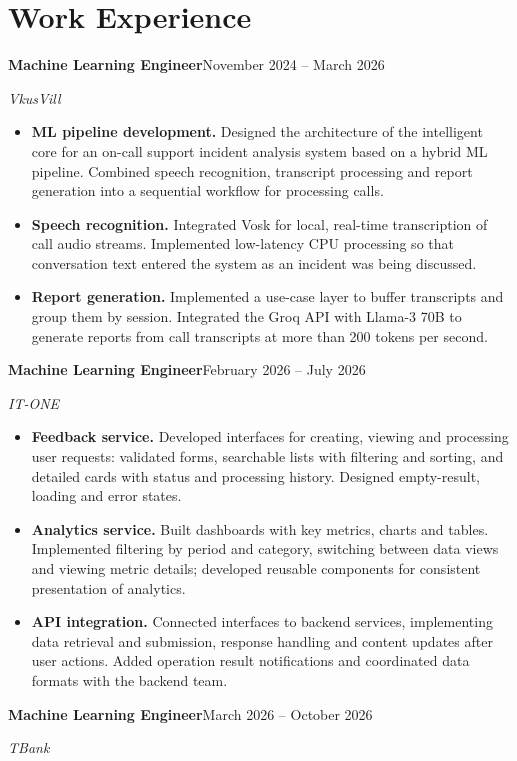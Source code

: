\documentclass[a4paper,11pt]{article}
\newcommand{\entry}[3]{\textbf{#1}\hfill #3\par\textit{#2}\par}
\begin{document}
\section*{Work Experience}
\entry{Machine Learning Engineer}{VkusVill}{November 2024 -- March 2026}
\begin{itemize}
\item \textbf{ML pipeline development.} Designed the architecture of the intelligent core for an on-call support incident analysis system based on a hybrid ML pipeline. Combined speech recognition, transcript processing and report generation into a sequential workflow for processing calls.
\item \textbf{Speech recognition.} Integrated Vosk for local, real-time transcription of call audio streams. Implemented low-latency CPU processing so that conversation text entered the system as an incident was being discussed.
\item \textbf{Report generation.} Implemented a use-case layer to buffer transcripts and group them by session. Integrated the Groq API with Llama-3 70B to generate reports from call transcripts at more than 200 tokens per second.
\end{itemize}
\vspace{4pt}
\entry{Machine Learning Engineer}{IT-ONE}{February 2026 -- July 2026}
\begin{itemize}
\item \textbf{Feedback service.} Developed interfaces for creating, viewing and processing user requests: validated forms, searchable lists with filtering and sorting, and detailed cards with status and processing history. Designed empty-result, loading and error states.
\item \textbf{Analytics service.} Built dashboards with key metrics, charts and tables. Implemented filtering by period and category, switching between data views and viewing metric details; developed reusable components for consistent presentation of analytics.
\item \textbf{API integration.} Connected interfaces to backend services, implementing data retrieval and submission, response handling and content updates after user actions. Added operation result notifications and coordinated data formats with the backend team.
\end{itemize}
\vspace{4pt}
\entry{Machine Learning Engineer}{TBank}{March 2026 -- October 2026}
\end{document}
